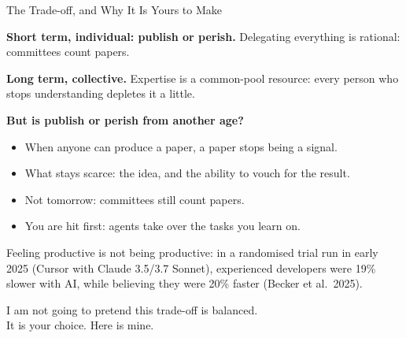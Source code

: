 \documentclass[svgnames,x11names,dvipsnames]{beamer}
\begin{document}
\begin{frame}{The Trade-off, and Why It Is Yours to Make}

\small
\textbf{Short term, individual: publish or perish.}
Delegating everything is rational: committees count papers.

\vspace{0.2cm}

\textbf{Long term, collective.}
Expertise is a common-pool resource: every person who stops understanding depletes it a little.

\vspace{0.2cm}

\textbf{But is publish or perish from another age?}
\begin{itemize}
    \setlength{\itemsep}{1pt}
    \item When anyone can produce a paper, a paper stops being a signal.
    \item What stays scarce: the idea, and the ability to vouch for the result.
    \item Not tomorrow: committees still count papers.
    \item You are hit first: agents take over the tasks you learn on.
\end{itemize}

\vspace{0.1cm}

{\footnotesize Feeling productive is not being productive: in a randomised trial run in early 2025 (Cursor with Claude 3.5/3.7 Sonnet), experienced developers were \alert{19\% slower} with AI, while believing they were 20\% faster (Becker et al.\ 2025).}

\vspace{0.25cm}

\centering
\normalsize
I am not going to pretend this trade-off is balanced.\\ It is your choice. Here is mine.

\end{frame}
\end{document}
